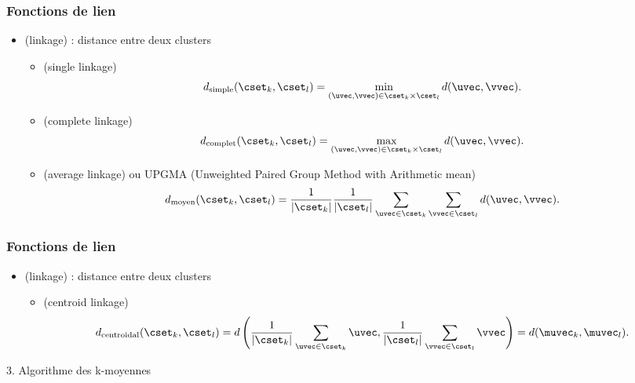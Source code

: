 \begin{frame}
  \frametitle{Fonctions de lien}
  \begin{itemize}
  \item {} \textcolor{gray!70}{(linkage)} : distance entre deux clusters
    \begin{itemize}
    \item {} \textcolor{gray!70}{(single linkage)}
      \[ d_{\text{simple}}(\cset_k, \cset_l) = \min_{(\uvec, \vvec) \in \cset_k \times \cset_l } d(\uvec, \vvec).
      \]
      \pause
    \item {} \textcolor{gray!70}{(complete linkage)}
      \[
        d_{\text{complet}}(\cset_k, \cset_l) = \max_{(\uvec, \vvec) \in \cset_k \times \cset_l} d(\uvec, \vvec).
      \]
      \pause
    \item {} \textcolor{gray!70}{(average linkage)} ou UPGMA \textcolor{gray!70}{(Unweighted Paired Group Method with Arithmetic mean)}
      \[
        d_{\text{moyen}}(\cset_k, \cset_l) = \frac1{\lvert \cset_k \rvert} 
        \frac1{\lvert \cset_l \rvert}
        \sum_{\uvec \in \cset_k}\sum_{\vvec \in \cset_l} d(\uvec, \vvec).
      \]
    \end{itemize}
  \end{itemize}
\end{frame}

\begin{frame}[t]
  \frametitle{Fonctions de lien}
  \begin{itemize}
  \item {} \textcolor{gray!70}{(linkage)} : distance entre deux clusters
    \begin{itemize}
    \item {} \textcolor{gray!70}{(centroid linkage)}
      \[
        d_{\text{centroidal}}(\cset_k, \cset_l) = d \left (\frac1{\lvert \cset_k \rvert} 
          \sum_{\uvec \in \cset_k} \uvec, 
          \frac1{\lvert \cset_l \rvert} \sum_{\vvec \in \cset_l} \vvec \right) = 
        d(\muvec_k, \muvec_l).
      \]
    \end{itemize}
  \end{itemize}
\end{frame}


\begin{frame}
  \begin{center}
    \large{3. Algorithme des k-moyennes}
  \end{center}
\end{frame}


